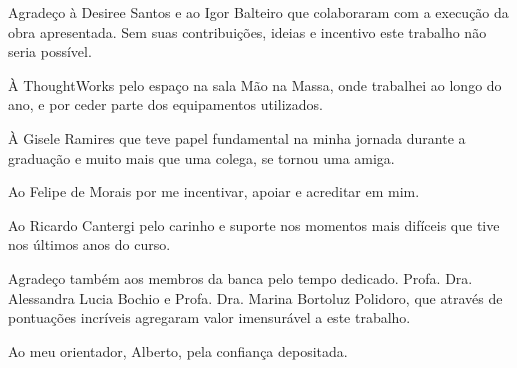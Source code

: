 \begin{agradecimento}

Agradeço à Desiree Santos e ao Igor Balteiro que colaboraram com a execução da obra apresentada. Sem suas contribuições, ideias e incentivo este trabalho não seria possível. 

À ThoughtWorks pelo espaço na sala Mão na Massa, onde trabalhei ao longo do ano, e por ceder parte dos equipamentos utilizados.

À Gisele Ramires que teve papel fundamental na minha jornada durante a graduação e muito mais que uma colega, se tornou uma amiga. 

Ao Felipe de Morais por me incentivar, apoiar e acreditar em mim. 

Ao Ricardo Cantergi pelo carinho e suporte nos momentos mais difíceis que tive nos últimos anos do curso. 

Agradeço também aos membros da banca pelo tempo dedicado. Profa. Dra. Alessandra Lucia Bochio e Profa. Dra. Marina Bortoluz Polidoro, que através de pontuações incríveis agregaram valor imensurável a este trabalho.

Ao meu orientador, Alberto, pela confiança depositada.

\end{agradecimento}